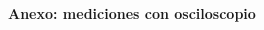\documentclass[a4paper]{article}
\begin{document}
    
    
    
    \saltoPag{}
    \begin{multicols}{2} 
         
    \end{multicols}

    \clearpage
    \thispagestyle{empty}
    \null
    \vfill
    \begin{center}
        \Huge \textbf{Anexo: mediciones con osciloscopio}
    \end{center}
    \vfill
    \clearpage

    \begin{multicols}{2}
        
    \end{multicols}
\end{document}
